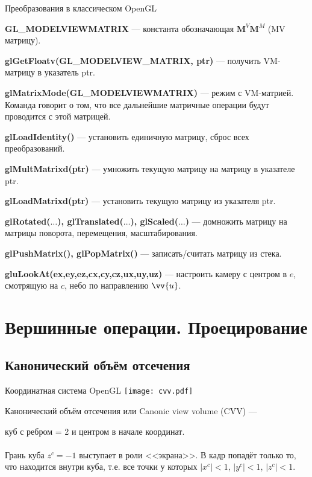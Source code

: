 \documentclass[10pt]{beamer}
\begin{document}
	\begin{frame}{Преобразования в классическом OpenGL}
		
		\textbf{GL\_MODELVIEWMATRIX} --- константа обозначающая $\mathbf M^V \mathbf M^M$ (MV матрицу).
		
		\textbf{glGetFloatv(GL\_MODELVIEW\_MATRIX, ptr)} --- получить VM-матрицу в указатель ptr.
		
		\textbf{glMatrixMode(GL\_MODELVIEWMATRIX)} --- режим с VM-матрией. Команда говорит о том, что все дальнейшие матричные операции будут проводится с этой матрицей.
		
		\textbf{glLoadIdentity()}  --- установить единичную матрицу, сброс всех преобразований.
		
		\textbf{glMultMatrixd(ptr)} --- умножить текущую матрицу на матрицу в указателе ptr.
		
		\textbf{glLoadMatrixd(ptr)} --- установить текущую матрицу из указателя ptr.
		
		\textbf{glRotated($\dots$), glTranslated($\dots$), glScaled($\dots$)}  --- домножить матрицу на матрицы поворота, перемещения, масштабирования.
		
		\textbf{glPushMatrix(), glPopMatrix() }--- записать/считать матрицу из стека.
		
		\textbf{gluLookAt(ex,ey,ez,cx,cy,cz,ux,uy,uz)} --- настроить камеру с центром в $e$, смотрящую на $c$, небо по направлению $\vv{u}$.		
		
	\end{frame}
	
	\section{Вершинные операции. Проецирование}
	
	\frame {\sectionpage}
	
	\subsection{Канонический объём отсечения}
	
	\begin{frame}{Координатная система OpenGL}
		{
			\texttt{[image: cvv.pdf]}
		}
		{
			Канонический объём отсечения или Canonic view volume (CVV) ---
			
			куб с ребром = 2 и центром в начале координат. \\~\\
			
			Грань куба $z^c=-1$ выступает в роли <<экрана>>. В кадр попадёт только то, что находится внутри куба, т.е. все точки у которых $|x^c|<1$,  $|y^c|<1$, $|z^c|< 1$.
		}
	\end{frame}
	
\end{document}
